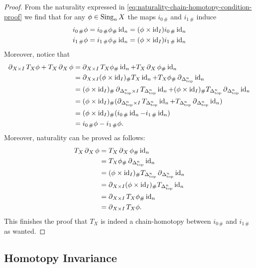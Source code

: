 \begin{proof}
From the naturality expressed in
\cref{eq:naturality-chain-homotopy-condition-proof} we find that for any \(\phi
\in \Sing_n X\) the maps \(i_{0\, \#}\) and \(i_{1\, \#}\) induce
\begin{align*}
  i_{0\, \#} \phi
  &= i_{0\, \#} \phi_{\#} \Id_n
    = (\phi \times \Id_I) i_{0\, \#} \Id_n \\
  i_{1\, \#} \phi
  &= i_{1\, \#} \phi_{\#} \Id_n
    = (\phi \times \Id_I) i_{1\, \#} \Id_n \\
\end{align*}
Moreover, notice that
\begin{align*}
  \face_{X \times I} T_X \phi + T_X \face_X \phi
  &= \face_{X \times I} T_X \phi_{\#} \Id_n
     + T_X \face_X \phi_{\#} \Id_n \\
  &= \face_{X \times I} (\phi \times \Id_I)_{\#} T_X \Id_n
    + T_X \phi_{\#} \face_{\splxtop^n} \Id_n \\
  &= (\phi \times \Id_I)_{\#} \face_{\splxtop^n \times I} T_{\splxtop^n} \Id_n
    + (\phi \times \Id_I)_{\#} T_{\splxtop^n} \face_{\splxtop^n} \Id_n \\
  &= (\phi \times \Id_I)_{\#} (\face_{\splxtop^n \times I} T_{\splxtop^n} \Id_n
    + T_{\splxtop^n} \face_{\splxtop^n} \Id_n) \\
  &= (\phi \times \Id_I)_{\#} (i_{0\, \#} \Id_n - i_{1\, \#} \Id_n) \\
  &= i_{0\, \#} \phi - i_{1\, \#} \phi.
\end{align*}
Moreover, naturality can be proved as follows:
\begin{align*}
  T_X \face_X \phi
  &= T_X \face_X \phi_{\#} \Id_n \\
  &= T_X \phi_{\#} \face_{\splxtop^n} \Id_n \\
  &= (\phi \times \Id_I)_{\#} T_{\splxtop^n} \face_{\splxtop^n} \Id_n \\
  &= \face_{X \times I} (\phi \times \Id_I)_{\#} T_{\splxtop^n} \Id_n \\
  &= \face_{X \times I} T_X \phi_{\#} \Id_n \\
  &= \face_{X \times I} T_X \phi.
\end{align*}
This finishes the proof that \(T_X\) is indeed a chain-homotopy between
\(i_{0\, \#}\) and \(i_{1\, \#}\) as wanted.
\end{proof}

\subsection{Homotopy Invariance}

